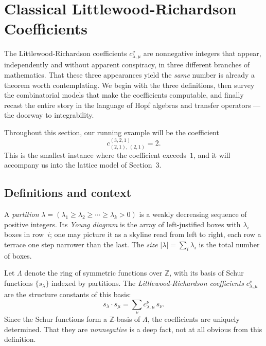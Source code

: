 
\section{Classical Littlewood-Richardson Coefficients}
\label{sec:classical}

The Littlewood-Richardson coefficients $c^{\nu}_{\lambda,\mu}$ are
nonnegative integers that appear, independently and without apparent
conspiracy, in three different branches of mathematics.  That these
three appearances yield the \emph{same} number is already a theorem
worth contemplating.  We begin with the three definitions, then survey
the combinatorial models that make the coefficients computable, and
finally recast the entire story in the language of Hopf algebras and
transfer operators --- the doorway to integrability.

Throughout this section, our running example will be the coefficient
\[
  c^{(3,2,1)}_{(2,1),\,(2,1)} = 2.
\]
This is the smallest instance where the coefficient exceeds~$1$, and it
will accompany us into the lattice model of Section~3.

\subsection{Definitions and context}
\label{sec:classical-defn}

A \emph{partition} $\lambda = (\lambda_1 \ge \lambda_2 \ge \cdots \ge
\lambda_k > 0)$ is a weakly decreasing sequence of positive integers.
Its \emph{Young diagram} is the array of left-justified boxes with
$\lambda_i$ boxes in row~$i$; one may picture it as a skyline read
from left to right, each row a terrace one step narrower than the
last.  The \emph{size} $|\lambda| = \sum_i \lambda_i$ is the total
number of boxes.

\begin{definition}
\label{def:lr-symm}
Let $\Lambda$ denote the ring of symmetric functions over $\mathbb{Z}$,
with its basis of Schur functions $\{s_\lambda\}$ indexed by partitions.
The \emph{Littlewood-Richardson coefficients} $c^{\nu}_{\lambda,\mu}$
are the structure constants of this basis:
\[
  s_\lambda \cdot s_\mu
  = \sum_{\nu} c^{\nu}_{\lambda,\mu}\, s_\nu.
\]
Since the Schur functions form a $\mathbb{Z}$-basis of $\Lambda$, the
coefficients are uniquely determined.  That they are
\emph{nonneg\-ative} is a deep fact, not at all obvious from this
definition.
\end{definition}

